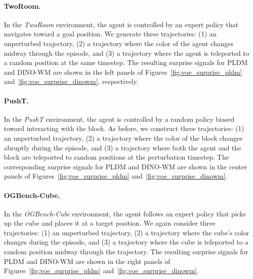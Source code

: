 \paragraph{TwoRoom.}
In the \textit{TwoRoom} environment, the agent is controlled by an expert policy that navigates toward a goal position. We generate three trajectories: (1) an unperturbed trajectory, (2) a trajectory where the color of the agent changes midway through the episode, and (3) a trajectory where the agent is teleported to a random position at the same timestep. The resulting surprise signals for PLDM and DINO-WM are shown in the left panels of Figures~\ref{fig:voe_surprise_pldm} and~\ref{fig:voe_surprise_dinowm}, respectively.

\paragraph{PushT.}
In the \textit{PushT} environment, the agent is controlled by a random policy biased toward interacting with the block. As before, we construct three trajectories: (1) an unperturbed trajectory, (2) a trajectory where the color of the block changes abruptly during the episode, and (3) a trajectory where both the agent and the block are teleported to random positions at the perturbation timestep. The corresponding surprise signals for PLDM and DINO-WM are shown in the center panels of Figures~\ref{fig:voe_surprise_pldm} and~\ref{fig:voe_surprise_dinowm}.

\paragraph{OGBench-Cube.}
In the \textit{OGBench-Cube} environment, the agent follows an expert policy that picks up the cube and places it at a target position. We again consider three trajectories: (1) an unperturbed trajectory, (2) a trajectory where the cube's color changes during the episode, and (3) a trajectory where the cube is teleported to a random position midway through the trajectory. The resulting surprise signals for PLDM and DINO-WM are shown in the right panels of Figures~\ref{fig:voe_surprise_pldm} and~\ref{fig:voe_surprise_dinowm}.

